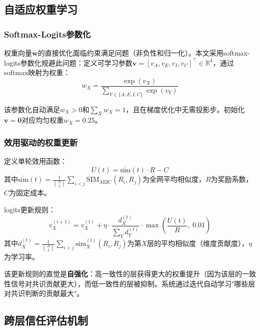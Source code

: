 \documentclass[12pt,a4paper,UTF8,fontset=fandol]{ctexart}
\begin{document}
\subsection{自适应权重学习}\label{sec:adaptive}

\subsubsection{Softmax-Logits参数化}

权重向量$\mathbf{w}$的直接优化面临约束满足问题（非负性和归一化）。本文采用softmax-logits参数化规避此问题：定义可学习参数$\mathbf{v} = [v_A, v_E, v_I, v_C]^\top \in \mathbb{R}^4$，通过softmax映射为权重：
\begin{equation}\label{eq:softmax}
w_X = \frac{\exp(v_X)}{\sum_{Y \in \{A,E,I,C\}} \exp(v_Y)}
\end{equation}

该参数化自动满足$w_X > 0$和$\sum_X w_X = 1$，且在梯度优化中无需投影步。初始化$\mathbf{v} = \mathbf{0}$对应均匀权重$w_X = 0.25$。

\subsubsection{效用驱动的权重更新}

定义单轮效用函数：
\begin{equation}
U(t) = \overline{\text{sim}}(t) \cdot R - C
\end{equation}
其中$\overline{\text{sim}}(t) = \frac{1}{\binom{N}{2}} \sum_{i<j} \text{SIM}_{\text{AEIC}}(R_i, R_j)$为全网平均相似度，$R$为奖励系数，$C$为固定成本。

logits更新规则：
\begin{equation}\label{eq:weight_update}
v_X^{(t+1)} = v_X^{(t)} + \eta \cdot \frac{d_X^{(t)}}{\sum_Y d_Y^{(t)}} \cdot \max\!\left(\frac{U(t)}{R},\; 0.01\right)
\end{equation}
其中$d_X^{(t)} = \frac{1}{\binom{N}{2}} \sum_{i<j} \text{sim}_X^{(t)}(R_i, R_j)$为第$X$层的平均相似度（维度贡献度），$\eta$为学习率。

该更新规则的直觉是\textbf{自强化}：高一致性的层获得更大的权重提升（因为该层的一致性信号对共识贡献更大），而低一致性的层被抑制。系统通过迭代自动学习"哪些层对共识判断的贡献最大"。

\subsection{跨层信任评估机制}\label{sec:trust}
\end{document}
